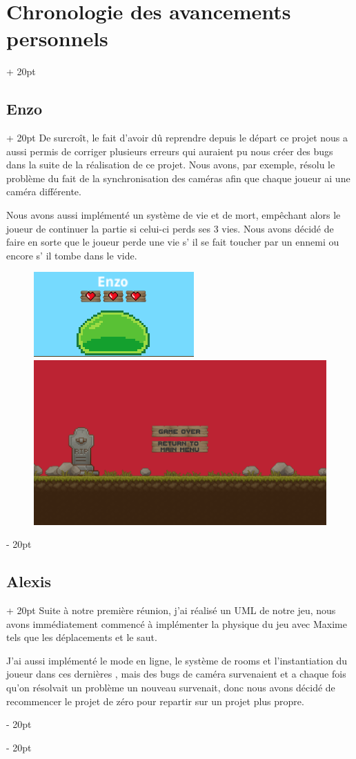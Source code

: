 \documentclass[a4paper, 12pt, twoside]{article}
\newcommand{\ind}[1][20pt]{\advance\leftskip + #1}
\newcommand{\deind}[1][20pt]{\advance\leftskip - #1}
\newenvironment{indt}[2][20pt]{#2 \par \ind[#1]}{\par \deind} %
\begin{document}
\begin{indt}{\section{Chronologie des avancements personnels}}
\begin{indt}{\subsection{Enzo}}
            De surcroît, le fait d'avoir dû reprendre depuis le départ ce projet nous a aussi permis de corriger plusieurs erreurs qui auraient pu nous créer des bugs dans la suite de la réalisation de ce projet. Nous avons, par exemple, résolu le problème du fait de la synchronisation des caméras afin que chaque joueur ai une caméra différente.
        	
            Nous avons aussi implémenté un système de vie et de mort, empêchant alors le joueur de continuer la partie si celui-ci perds ses 3 vies. Nous avons décidé de faire en sorte que le joueur perde une vie s' il se fait toucher par un ennemi ou encore s' il tombe dans le vide.

            \begin{figure}
                \includegraphics[width=0.49\linewidth]{Slime1.png}\hfill \hfill\includegraphics[width=0.49\linewidth]{GameOver.png}
            \end{figure}
        \end{indt}

        \begin{indt}{\subsection{Alexis}}
            Suite à notre première réunion, j'ai réalisé un UML de notre jeu, nous avons immédiatement commencé à implémenter la physique du jeu avec Maxime tels que les déplacements et le saut.

            J'ai aussi implémenté le mode en ligne, le système de rooms et l'instantiation du joueur dans ces dernières , mais des bugs de caméra survenaient et a chaque fois qu'on résolvait un problème un nouveau survenait, donc nous avons décidé de recommencer le projet de zéro pour repartir sur un projet plus propre.


\end{indt}
\end{indt}
\end{document}

